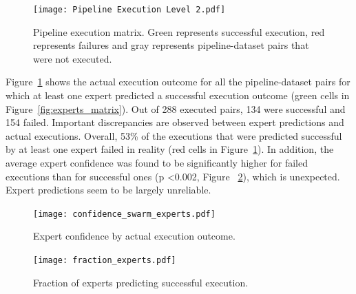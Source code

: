 \documentclass[conference]{IEEEtran}
\begin{document}

\begin{figure}
  \texttt{[image: Pipeline Execution Level 2.pdf]}
  \caption{Pipeline execution matrix. Green represents successful execution, red represents failures and gray represents pipeline-dataset pairs that were not executed. }
  \label{fig:execution_matrix}
\end{figure}

Figure~\ref{fig:execution_matrix} shows the actual execution outcome for
all the pipeline-dataset pairs for which at least one expert predicted a
successful execution outcome (green cells in
Figure~\ref{fig:experts_matrix}). Out of 288 executed pairs, 134   were
successful and 154 failed. 
Important discrepancies are observed between expert predictions and actual
executions. Overall, 53\% of the executions that were predicted successful by
at least one expert failed in reality (red cells in
Figure~\ref{fig:execution_matrix}). In addition, the average expert
confidence was found to be significantly higher for failed executions than
for successful ones (p \textless 0.002, Figure
~\ref{fig:confidence_swarm}), which is unexpected. Expert predictions
seem to be largely unreliable.

\begin{figure}
  \texttt{[image: confidence\_swarm\_experts.pdf]}
  \caption{Expert confidence by actual execution outcome.}
  \label{fig:confidence_swarm}
\end{figure}

\begin{figure}
  \texttt{[image: fraction\_experts.pdf]}
  \caption{Fraction of experts predicting successful execution. }
  \label{fig:fraction_experts}
\end{figure}
\end{document}
